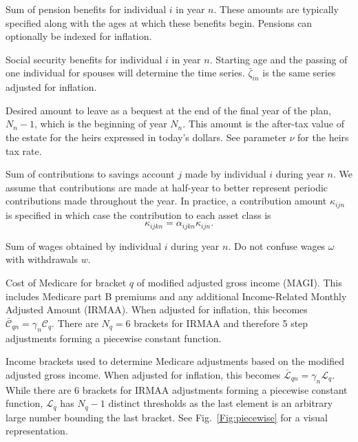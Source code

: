\documentclass{report}[fleqn,11pt]
\begin{document}
\begin{description}[leftmargin=4em,style=multiline]
\item [$\pi_{in}$]
	Sum of pension benefits for individual $i$ in year $n$. These amounts are typically
	specified along with the ages at which these benefits begin.
	Pensions can optionally be indexed for inflation.
\item [$\zeta_{in}$]
	Social security benefits for individual $i$ in year $n$. Starting age and the passing
	of one individual for spouses will determine the time series. $\bar{\zeta}_{in}$ is
	the same series adjusted for inflation.
\item [$\epsilon_{N_n}$]
	Desired amount to leave as a bequest at the end of the final year of the plan, $N_n-1$,
	which is the beginning of year $N_n$. This amount is the after-tax value of the estate
	for the heirs expressed in today's dollars. See parameter $\nu$ for the heirs tax rate.
\item [$\kappa_{ijn}$]
	Sum of contributions to savings account $j$ made by individual $i$ during year $n$.
	We assume that contributions are made at half-year to better represent periodic
        contributions made throughout the year.
	In practice, a contribution
	amount $\kappa_{ijn}$ is specified in which case the contribution to each asset
	class is
	\begin{equation}
		\kappa_{ijkn} = \alpha_{ijkn}\kappa_{ijn}.
	\end{equation}
\item [$\omega_{in}$]
	Sum of wages obtained by individual $i$ during year $n$.
	Do not confuse wages $\omega$ with withdrawals $w$.
\item [$\mathcal{C}_{q}$]
	Cost of Medicare for bracket $q$ of modified adjusted gross income (MAGI). This includes
	Medicare part B premiums and any additional
	Income-Related Monthly Adjusted Amount (IRMAA). When adjusted
	for inflation, this becomes $\bar{\mathcal{C}}_{qn} = \gamma_n\mathcal{C}_q$.
        There are $N_q = 6$ brackets for IRMAA and therefore 5 step adjustments forming
        a piecewise constant function.
\item [$\mathcal{L}_{q}$]
	Income brackets used to determine Medicare adjustments based on the modified adjusted gross income.
	When adjusted for inflation, this becomes $\bar{\mathcal{L}}_{qn} = \gamma_n\mathcal{L}_q$.
        While there are 6 brackets for IRMAA adjustments forming a piecewise constant function,
	$\mathcal{L}_q$ has $N_q - 1$ distinct thresholds as the last element is an arbitrary large
        number bounding the last bracket. See Fig.~\ref{Fig:piecewise} for a visual representation.

\end{description}
\end{document}
